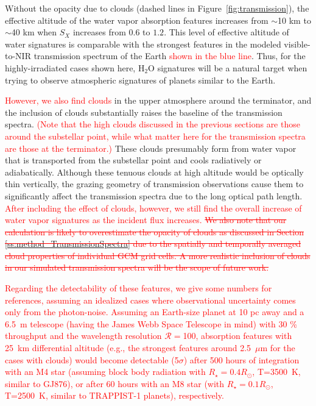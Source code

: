 \documentclass[11pt,numberedappendix,twocolappendix,]{emulateapj}
\def\water{H$_2$O}
\def\addYF#1{\textcolor{red}{#1}}
\def\changeYF#1#2{\textcolor{red}{\sout{#1} #2}}
\begin{document}
Without the opacity due to clouds (dashed lines in Figure~\ref{fig:transmission}), the effective altitude of the water vapor absorption features increases from $\sim $10 km to $\sim $40 km when $S_X$ increases from $0.6$ to $1.2$. 
This level of effective altitude of water signatures is comparable with the strongest features in the modeled visible-to-NIR transmission spectrum of the Earth \addYF{shown in the blue line}. %
Thus, for the highly-irradiated cases shown here, \water{} signatures will be a natural target when trying to observe atmospheric signatures of planets similar to the Earth. 

\addYF{However, we also find clouds} 
in the upper atmosphere around the terminator, and the inclusion of clouds substantially raises the baseline of the transmission spectra. 
\addYF{(Note that the high clouds discussed in the previous sections are those around the substellar point, while what matter here for the transmission spectra are those at the terminator.)} 
These clouds presumably form from water vapor that is transported from the substellar point and cools radiatively or adiabatically. 
Although these tenuous clouds at high altitude would be optically thin vertically, the grazing geometry of transmission observations cause them to significantly affect the transmission spectra due to the long optical path length. 
\addYF{After including the effect of clouds, however, we still find the overall increase of water vapor signatures as the incident flux increases. }
\changeYF{We also note that our calculation is likely to overestimate the opacity of clouds as discussed in Section \ref{ss:method_TransmissionSpectra} due to the spatially and temporally averaged cloud properties of individual GCM grid cells. %
A more realistic inclusion of clouds in our simulated transmission spectra will be the scope of future work. }{}

\addYF{%
Regarding the detectability of these features, we give some numbers for references, assuming an idealized cases where observational uncertainty comes only from the photon-noise. 
Assuming an Earth-size planet at 10 pc away and a 6.5~m telescope (having the James Webb Space Telescope in mind) with 30 \% throughput and the wavelength resolution $\mathcal{R}=$100, absorption features with 25~km differential altitude (e.g., the strongest features around 2.5~$\mu$m for the cases with clouds) would become detectable (5$\sigma $) after 500 hours of integration with an M4 star (assuming block body radiation with $R_{\star }=0.4 R_{\odot }$, T=3500~K, similar to GJ876), or after 60 hours with an M8 star (with $R_{\star }=0.1 R_{\odot }$, T=2500~K, similar to TRAPPIST-1 planets), respectively. }
\end{document}
